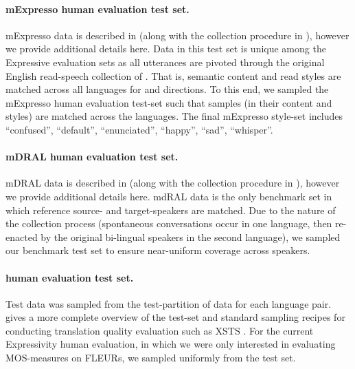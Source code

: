 \paragraph{mExpresso human evaluation test set.} mExpresso data is described in  (along with the collection procedure in ), however we provide additional details here. Data in this test set is unique among the Expressive evaluation sets as all utterances are pivoted through the original English read-speech collection of \citep{nguyen2023expresso}. That is, semantic content and read styles are matched across all languages for \xeng and \engx directions. To this end, we sampled the mExpresso human evaluation test-set such that samples (in their content and styles) are matched across the languages. The final mExpresso style-set includes ``confused'', ``default'', ``enunciated'', ``happy'', ``sad'',  ``whisper''.

\paragraph{mDRAL human evaluation test set.} mDRAL data is described in  (along with the collection procedure in ), however we provide additional details here. mdRAL data is the only benchmark set in which reference source- and target-speakers are matched. Due to the nature of the collection process (spontaneous conversations occur in one language, then re-enacted by the original bi-lingual speakers in the second language), we sampled our benchmark test set to ensure near-uniform coverage across speakers.

\paragraph{\fleurs human evaluation test set.} Test data was sampled from the test-partition of \fleurs data \citep{conneau2020unsupervised} for each language pair. \citet{SeamlessM4TArXiv} gives a more complete overview of the \fleurs test-set and standard sampling recipes for conducting translation quality evaluation such as XSTS \citep{licht2022xsts}. For the current Expressivity human evaluation, in which we were only interested in evaluating MOS-measures on FLEURs, we sampled uniformly from the test set.

